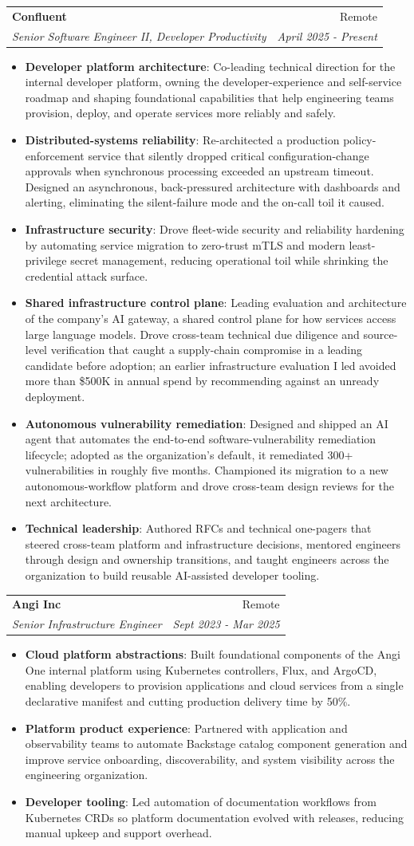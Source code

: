 \documentclass[letterpaper,11pt]{article}
\makeatletter
\newcommand{\resumeItem}[2]{
\item\small{
\textbf{#1}{: #2 \vspace{-2pt}}
}
}
\newcommand{\resumeSubheading}[4]{
\vspace{-1pt}\item
\begin{tabular*}{0.97\textwidth}[t]{l@{\extracolsep{\fill}}r}
    \textbf{#1}       & #2                 \\
    \textit{\small#3} & \textit{\small #4} \\
\end{tabular*}\vspace{-3pt}
}
\newcommand{\resumeItemListStart}{\begin{itemize}}
\newcommand{\resumeItemListEnd}{\end{itemize}\vspace{-5pt}}
\makeatother
\begin{document}
\resumeSubheading
{Confluent}{Remote}
{Senior Software Engineer II, Developer Productivity}{April 2025 - Present}
\resumeItemListStart
\resumeItem{Developer platform architecture}
{Co-leading technical direction for the internal developer platform, owning the developer-experience and self-service roadmap and shaping foundational capabilities that help engineering teams provision, deploy, and operate services more reliably and safely.}
\resumeItem{Distributed-systems reliability}
{Re-architected a production policy-enforcement service that silently dropped critical configuration-change approvals when synchronous processing exceeded an upstream timeout. Designed an asynchronous, back-pressured architecture with dashboards and alerting, eliminating the silent-failure mode and the on-call toil it caused.}
\resumeItem{Infrastructure security}
{Drove fleet-wide security and reliability hardening by automating service migration to zero-trust mTLS and modern least-privilege secret management, reducing operational toil while shrinking the credential attack surface.}
\resumeItem{Shared infrastructure control plane}
{Leading evaluation and architecture of the company's AI gateway, a shared control plane for how services access large language models. Drove cross-team technical due diligence and source-level verification that caught a supply-chain compromise in a leading candidate before adoption; an earlier infrastructure evaluation I led avoided more than \$500K in annual spend by recommending against an unready deployment.}
\resumeItem{Autonomous vulnerability remediation}
{Designed and shipped an AI agent that automates the end-to-end software-vulnerability remediation lifecycle; adopted as the organization's default, it remediated 300+ vulnerabilities in roughly five months. Championed its migration to a new autonomous-workflow platform and drove cross-team design reviews for the next architecture.}
\resumeItem{Technical leadership}
{Authored RFCs and technical one-pagers that steered cross-team platform and infrastructure decisions, mentored engineers through design and ownership transitions, and taught engineers across the organization to build reusable AI-assisted developer tooling.}
\resumeItemListEnd

\resumeSubheading
{Angi Inc}{Remote}
{Senior Infrastructure Engineer}{Sept 2023 - Mar 2025}
\resumeItemListStart
\resumeItem{Cloud platform abstractions}
{Built foundational components of the Angi One internal platform using Kubernetes controllers, Flux, and ArgoCD, enabling developers to provision applications and cloud services from a single declarative manifest and cutting production delivery time by 50\%.}
\resumeItem{Platform product experience}
{Partnered with application and observability teams to automate Backstage catalog component generation and improve service onboarding, discoverability, and system visibility across the engineering organization.}
\resumeItem{Developer tooling}
{Led automation of documentation workflows from Kubernetes CRDs so platform documentation evolved with releases, reducing manual upkeep and support overhead.}
\resumeItemListEnd
\end{document}
